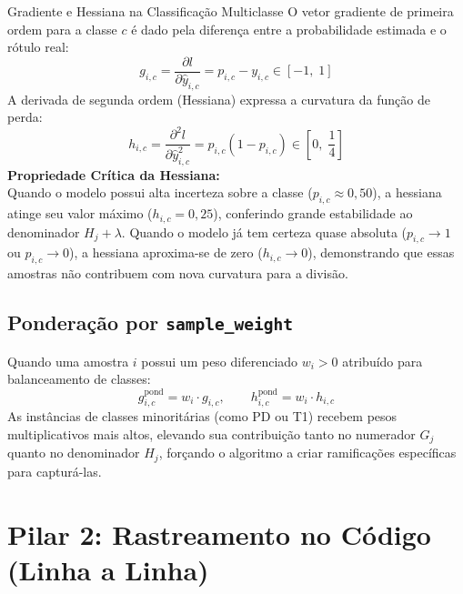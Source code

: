 \documentclass[11pt,a4paper]{article}
\begin{document}
\begin{mathBox}{Gradiente e Hessiana na Classificação Multiclasse}
O vetor gradiente de primeira ordem para a classe $c$ é dado pela diferença entre a probabilidade estimada e o rótulo real:
\begin{equation}
  g_{i, c} = \frac{\partial l}{\partial \hat{y}_{i, c}} = p_{i, c} - y_{i, c} \in [-1, \; 1]
  \label{eq:gradiente_multiclasse}
\end{equation}
A derivada de segunda ordem (Hessiana) expressa a curvatura da função de perda:
\begin{equation}
  h_{i, c} = \frac{\partial^2 l}{\partial \hat{y}_{i, c}^2} = p_{i, c} (1 - p_{i, c}) \in \left[0, \; \frac{1}{4}\right]
  \label{eq:hessiana_multiclasse}
\end{equation}
\textbf{Propriedade Crítica da Hessiana:}\\
Quando o modelo possui alta incerteza sobre a classe ($p_{i, c} \approx 0{,}50$), a hessiana atinge seu valor máximo ($h_{i, c} = 0{,}25$), conferindo grande estabilidade ao denominador $H_j + \lambda$. Quando o modelo já tem certeza quase absoluta ($p_{i, c} \to 1$ ou $p_{i, c} \to 0$), a hessiana aproxima-se de zero ($h_{i, c} \to 0$), demonstrando que essas amostras não contribuem com nova curvatura para a divisão.
\end{mathBox}

\subsection{Ponderação por \texttt{sample\_weight}}
Quando uma amostra $i$ possui um peso diferenciado $w_i > 0$ atribuído para balanceamento de classes:
\begin{equation}
  g_{i, c}^{\text{pond}} = w_i \cdot g_{i, c}, \qquad h_{i, c}^{\text{pond}} = w_i \cdot h_{i, c}
  \label{eq:sample_weight_math}
\end{equation}
As instâncias de classes minoritárias (como PD ou T1) recebem pesos multiplicativos mais altos, elevando sua contribuição tanto no numerador $G_j$ quanto no denominador $H_j$, forçando o algoritmo a criar ramificações específicas para capturá-las.

\vspace{0.4cm}
\section{Pilar 2: Rastreamento no Código (Linha a Linha)}
\end{document}
